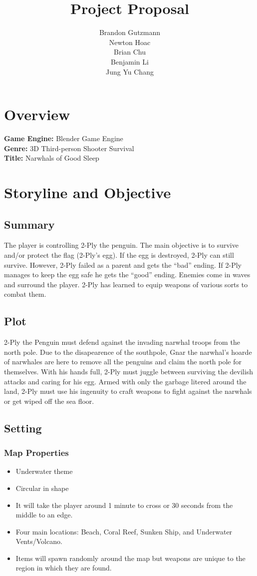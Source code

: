 \documentclass{article}
\title{Project Proposal}
\author{Brandon Gutzmann\\Newton Hoac\\Brian Chu\\Benjamin Li\\Jung Yu Chang}
\begin{document}
\maketitle
\tableofcontents
\section{Overview}
\textbf{Game Engine:} Blender Game Engine\\
\textbf{Genre:} 3D Third-person Shooter Survival\\
\textbf{Title:} Narwhals of Good Sleep

\section{Storyline and Objective}
\subsection{Summary}
The player is controlling 2-Ply the penguin. The main objective is to survive and/or protect the flag (2-Ply's egg). If the egg is destroyed, 2-Ply can still survive. However, 2-Ply failed as a parent and gets the ``bad'' ending. If 2-Ply manages to keep the egg safe he gets the ``good'' ending. Enemies come in waves and surround the player. 2-Ply has learned to equip weapons of various sorts to combat them.

\subsection{Plot}
2-Ply the Penguin must defend against the invading narwhal troops from the north pole. Due to the disapearence of the southpole, Gnar the narwhal's hoarde of narwhales are here to remove all the penguins and claim the north pole for themselves. With his hands full, 2-Ply must juggle between surviving the devilish attacks and caring for his egg. Armed with only the garbage litered around the land, 2-Ply must use his ingenuity to craft weapons to fight against the narwhals or get wiped off the sea floor.
\subsection{Setting}
\subsubsection{Map Properties}
\begin{itemize}
\item Underwater theme
\item Circular in shape
\item It will take the player around 1 minute to cross or 30 seconds from the middle to an edge.
\item Four main locations: Beach, Coral Reef, Sunken Ship, and Underwater Vents/Volcano. 
\item Items will spawn randomly around the map but weapons are unique to the region in which they are found.
\end{itemize}
\end{document}
